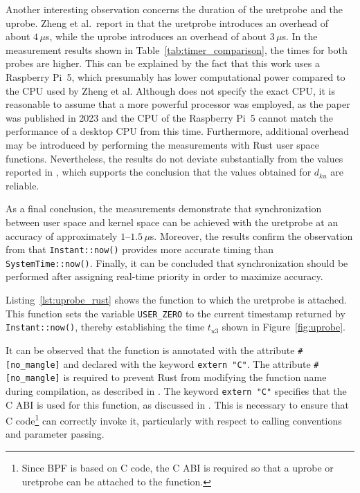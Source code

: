 Another interesting observation concerns the duration of the \ac{uretprobe} and the \ac{uprobe}.  
Zheng et al.\ report in \cite[p.~7]{zheng2023bpftimeuserspaceebpfruntime} that the \ac{uretprobe} introduces an overhead of about $4\,\mu$s, while the \ac{uprobe} introduces an overhead of about $3\,\mu$s.  
In the measurement results shown in Table~\ref{tab:timer_comparison}, the times for both probes are higher.  
This can be explained by the fact that this work uses a Raspberry Pi~5, which presumably has lower computational power compared to the \ac{CPU} used by Zheng et al.  
Although \cite{zheng2023bpftimeuserspaceebpfruntime} does not specify the exact \ac{CPU}, it is reasonable to assume that a more powerful processor was employed, as the paper was published in 2023 and the \ac{CPU} of the Raspberry Pi~5 cannot match the performance of a desktop \ac{CPU} from this time.  
Furthermore, additional overhead may be introduced by performing the measurements with Rust user space functions.  
Nevertheless, the results do not deviate substantially from the values reported in \cite{zheng2023bpftimeuserspaceebpfruntime}, which supports the conclusion that the values obtained for $d_{ku}$ are reliable.  

As a final conclusion, the measurements demonstrate that synchronization between user space and kernel space can be achieved with the \ac{uretprobe} at an accuracy of approximately $1$--$1.5\,\mu$s.  
Moreover, the results confirm the observation from \cite{systemtime} that \texttt{Instant::now()} provides more accurate timing than \texttt{SystemTime::now()}.  
Finally, it can be concluded that synchronization should be performed after assigning real-time priority in order to maximize accuracy.  

Listing~\ref{lst:uprobe_rust} shows the function to which the \ac{uretprobe} is attached.  
This function sets the variable \texttt{USER\_ZERO} to the current timestamp returned by \texttt{Instant::now()}, thereby establishing the time $t_{u3}$ shown in Figure~\ref{fig:uprobe}.  

It can be observed that the function is annotated with the attribute \texttt{\#[no\_mangle]} and declared with the keyword \texttt{extern "C"}.  
The attribute \texttt{\#[no\_mangle]} is required to prevent Rust from modifying the function name during compilation, as described in \cite{no_mangle}.  
The keyword \texttt{extern "C"} specifies that the C \ac{ABI} is used for this function, as discussed in \cite{extern}.  
This is necessary to ensure that C code\footnote{Since \ac{BPF} is based on C code, the C \ac{ABI} is required so that a \ac{uprobe} or \ac{uretprobe} can be attached to the function.} can correctly invoke it, particularly with respect to calling conventions and parameter passing.  

